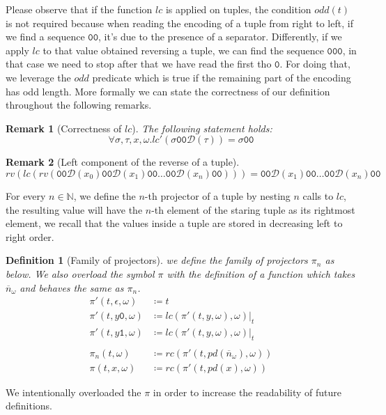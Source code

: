 \documentclass[10pt]{amsart}
\newcommand{\zero}{\mathtt{0}}
\newcommand{\one}{\mathtt{1}}
\newcommand{\vone}{x}
\newcommand{\vtwo}{y}
\newcommand{\none}{n}
\newcommand{\NN}{\mathbb{N}}
\newcommand{\oone}{\omega}
\newcommand{\pred}{pd}
\newcommand{\db}{\mathcal D}
\newtheorem{defn}{Definition}
\newtheorem{remark}{Remark}
\begin{document}
Please observe that if the function $lc$ is applied on tuples, the condition $odd(t)$ is not required because when reading the encoding of a tuple from right to left, if we find a sequence $\zero\zero$, it's due to the presence of a separator. Differently, if we apply $lc$ to that value obtained reversing a tuple, we can find the sequence $\zero\zero\zero$, in that case we need to stop after that we have read the first tho $\zero$. For doing that, we  leverage the $odd$ predicate which is true if the remaining part of the encoding has odd length. More formally we can state the correctness of our definition throughout the following remarks.

\begin{remark}[Correctness of $lc$] The following statement holds:
\[
\forall \sigma,\tau,\vone, \oone. lc' (\sigma\zero\zero\db(\tau)) = \sigma\zero\zero
\]
\end{remark}

\begin{remark}[Left component of the reverse of a tuple]
\label{remark:rvlcrv}
\[
rv(lc(rv(\zero\zero\db(x_0)\zero\zero\db(x_1)\zero\zero\ldots \zero\zero \db(x_n)\zero \zero))) = \zero \zero \db(x_1)\zero\zero\ldots \zero\zero \db(x_n)\zero\zero
\]
\end{remark}

For every $\none \in \NN$, we define the $\none$-th projector of a tuple by nesting $n$ calls to $lc$, the resulting value will have the $\none$-th element of the staring tuple as its rightmost element, we recall that the values inside a tuple are stored in decreasing left to right order.

\begin{defn}[Family of projectors]
we define the family of projectors $\pi_n$ as below. We also overload the symbol $\pi$ with the definition of a function which takes $\overline n_\oone$ and behaves the same as $\pi_n$.
\begin{align*}
\pi'(t, \epsilon, \oone)&\coloneqq t\\
\pi'(t, \vtwo\zero, \oone) &\coloneqq lc(\pi'(t, \vtwo, \oone), \oone)|_t\\
\pi'(t, \vtwo\one, \oone) &\coloneqq lc(\pi'(t, \vtwo, \oone), \oone)|_t\\\\
\pi_n(t, \oone) &\coloneqq rc(\pi'(t, \pred(\overline n_\oone), \oone))\\
\pi(t, \vone, \oone) &\coloneqq rc(\pi'(t, \pred(\vone), \oone))
\end{align*}
\end{defn}
We intentionally overloaded the $\pi$ in order to increase the readability of future definitions.
\end{document}
